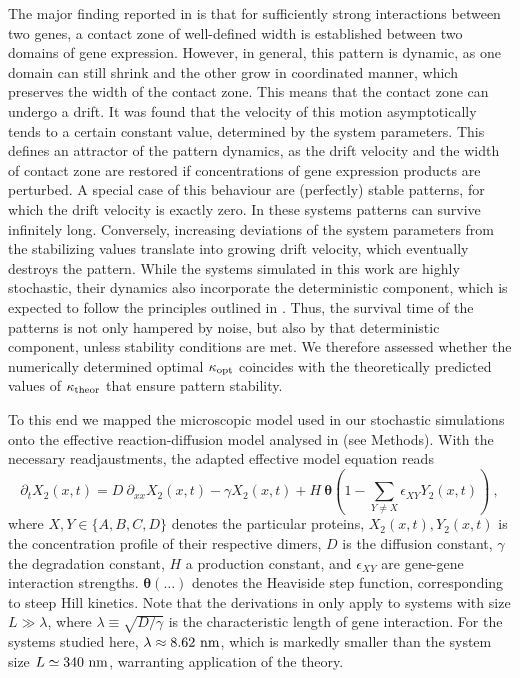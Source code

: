 \documentclass[a4paper,10pt]{article}
\begin{document}
The major finding reported in \cite{Majka2023} is that for sufficiently strong interactions between two genes, a contact zone of well-defined width is established between two domains of gene expression. However, in general, this pattern is dynamic, as one domain can still shrink and the other grow in coordinated manner, which preserves the width of the contact zone. This means that the contact zone can undergo a drift. It was found that the velocity of this motion asymptotically tends to a certain constant value, determined by the system parameters. This defines an attractor of the pattern dynamics, as the drift velocity and the width of contact zone are restored if concentrations of gene expression products are perturbed. A special case of this behaviour are (perfectly) stable patterns, for which the drift velocity is exactly zero. In these systems patterns can survive infinitely long. Conversely, increasing deviations of the system parameters from the stabilizing values translate into growing drift velocity, which eventually destroys the pattern. %
While the systems simulated in this work are highly stochastic, their dynamics also incorporate the deterministic component, which is expected to follow the principles outlined in \cite{Majka2023}. Thus, the survival time of the patterns is not only hampered by noise, but also by that deterministic component, unless stability conditions are met. We therefore assessed whether the numerically determined optimal $\kappa_{\rm opt}$ coincides with the theoretically predicted values of $\kappa_{\rm theor}$ that ensure pattern stability. 

To this end we mapped the microscopic model used in our stochastic simulations onto the effective reaction-diffusion model analysed in \cite{Majka2023} (see Methods). With the necessary readjaustments, the adapted effective model equation reads
\begin{equation}
\partial_t X_2(x,t)= D~\partial_{xx} X_2(x,t)-\gamma X_2(x,t)+H~\boldsymbol\theta\left(1-\sum_{Y\neq X} \epsilon_{XY} Y_2(x,t) \right) ~,\label{eq:effdyn}
\end{equation}
where $X,Y\in\{A,B,C,D\}$ denotes the particular proteins, $X_2(x,t), Y_2(x,t)$ is the concentration profile of their respective dimers, $D$ is the diffusion constant, $\gamma$ the degradation constant, $H$ a production constant, and $\epsilon_{XY}$ are gene-gene interaction strengths. $\boldsymbol\theta(\dots)$ denotes the Heaviside step function, corresponding to steep Hill kinetics.
Note that the derivations in \cite{Majka2023} only apply to systems with size $L\gg\lambda$, where $\lambda \equiv \sqrt{D/\gamma}$ is the characteristic length of gene interaction. For the systems studied here, $\lambda\approx 8.62~{\rm nm}$, which is markedly smaller than the system size $L\simeq 340~{\rm nm}$, warranting application of the theory.
\end{document}
